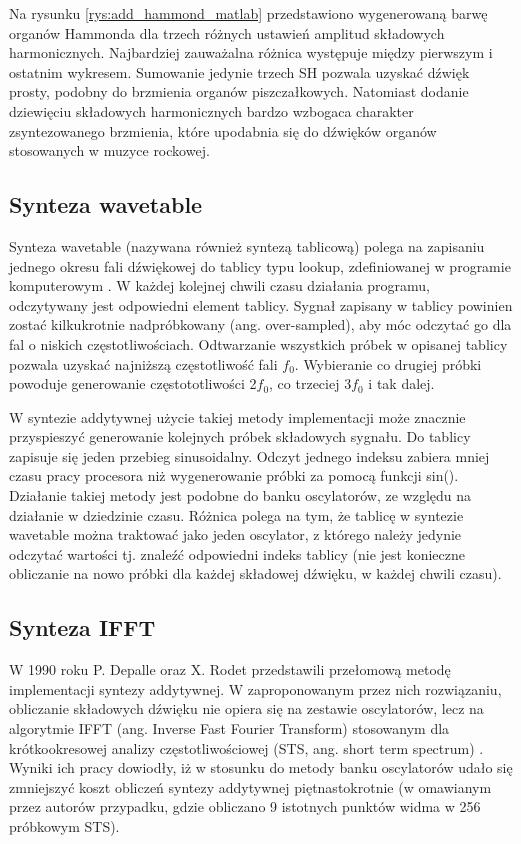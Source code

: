 Na rysunku \ref{rys:add_hammond_matlab} przedstawiono wygenerowaną barwę organów Hammonda dla trzech różnych ustawień amplitud składowych harmonicznych. Najbardziej zauważalna różnica występuje między pierwszym i ostatnim wykresem. 
Sumowanie jedynie trzech SH pozwala uzyskać dźwięk prosty, podobny do brzmienia organów piszczałkowych. Natomiast dodanie dziewięciu składowych harmonicznych bardzo wzbogaca charakter zsyntezowanego brzmienia, które upodabnia się do dźwięków organów stosowanych w muzyce rockowej.

\subsection{Synteza wavetable} \label{add_wavetable}
Synteza wavetable (nazywana również syntezą tablicową) polega na zapisaniu jednego okresu fali dźwiękowej do tablicy typu lookup, zdefiniowanej w programie komputerowym \cite{add_wavetab_synt}. W każdej kolejnej chwili czasu działania programu, odczytywany jest odpowiedni element tablicy. Sygnał zapisany w tablicy powinien zostać kilkukrotnie nadpróbkowany (ang. over-sampled), aby móc odczytać go dla fal o niskich częstotliwościach. 
Odtwarzanie wszystkich próbek w opisanej tablicy pozwala uzyskać najniższą częstotliwość fali $f_0$. Wybieranie co drugiej próbki powoduje generowanie częstototliwości 2$f_0$, co trzeciej 3$f_0$ i tak dalej.

W syntezie addytywnej użycie takiej metody implementacji może znacznie przyspieszyć generowanie kolejnych próbek składowych sygnału. Do tablicy zapisuje się jeden przebieg sinusoidalny. Odczyt jednego indeksu zabiera mniej czasu pracy procesora niż wygenerowanie próbki za pomocą funkcji sin(). Działanie takiej metody jest podobne do banku oscylatorów, ze względu na działanie w dziedzinie czasu. Różnica polega na tym, że tablicę w syntezie wavetable można traktować jako jeden oscylator, z którego należy jedynie odczytać wartości tj. znaleźć odpowiedni indeks tablicy (nie jest konieczne obliczanie na nowo próbki dla każdej składowej dźwięku, w każdej chwili czasu).

\subsection{Synteza IFFT}
W 1990 roku P. Depalle oraz X. Rodet \cite{add_ifft_orig} przedstawili przełomową metodę implementacji syntezy addytywnej. W zaproponowanym przez nich rozwiązaniu, obliczanie składowych dźwięku nie opiera się na zestawie oscylatorów, lecz na algorytmie IFFT (ang. Inverse Fast Fourier Transform) stosowanym dla krótkookresowej analizy częstotliwościowej (STS, ang. short term spectrum) \cite{add_ifft_method}. Wyniki ich pracy dowiodły, iż w stosunku do metody banku oscylatorów udało się zmniejszyć koszt obliczeń syntezy addytywnej piętnastokrotnie (w omawianym przez autorów przypadku, gdzie obliczano 9 istotnych punktów widma w 256 próbkowym STS).

